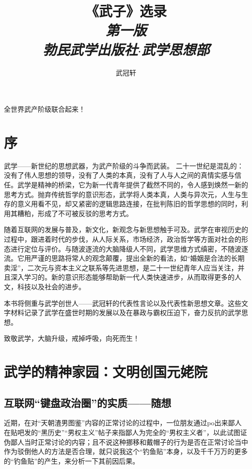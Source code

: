 \documentclass{ctexart}
\title{{\LARGE《武子》选录}\\\textit{第一版\\勃民武学出版社$\cdot$武学思想部}}
\author{武冠轩}
\date{}
\begin{document}
	\maketitle
	\vspace{10em}
	\begin{center}
		{\Large 全世界武产阶级联合起来！}
	\end{center}

	\pagebreak

	\section{序}
		武学——新世纪的思想武器，为武产阶级的斗争而武装。
		二十一世纪是混乱的：没有了伟人思想的领导，没有了人类的本真，没有了人与人之间的真情实感与信任。武学是精神的桥梁，它为新一代青年提供了截然不同的，令人感到焕然一新的思考方式。抛弃传统哲学的意识形态，武学将人类本真，人类与异次元，人生与生存的意义用看不见，却又紧密的逻辑思路连接，在批判陈旧的哲学思想的同时，利用其糟粕，形成了不可被反驳的思考方式。

		随着互联网的发展与普及，新文化，新观念与新思想触手可及。武学在审视历史的过程中，跟进着时代的步伐，从人际关系，市场经济，政治哲学等方面对社会的形态进行定位与评价。与随波逐流的大脑降级人不同，武学思维方式缜密，不随波逐流。它用严谨的思路将常人的观念颠覆，提出全新的看法，如“婚姻是合法的长期卖淫”，二次元与资本主义之联系等先进思想，是二十一世纪青年人应当关注，并且深入学习的。新的意识形态能够帮助新一代人类快速进步，从而取得更多的人文，科技以及社会的进步。

		本书将侧重与武学创世人——武冠轩的代表性言论以及代表性新思想文章。这些文字材料记录了武学在盛世时期的发展以及在暴政与霸权压迫下，奋力反抗的武学思想。

		致敬武学，大脑升级，戒掉呼吸，向死而生！
	
	\pagebreak
	\tableofcontents
	\pagebreak
	\section{武学的精神家园：文明创国元姥院}
	\subsection{互联网“键盘政治圈”的实质——随想}
	近期，在对“天朝渣男图鉴”内容的正常讨论的过程中，一位朋友通过po出来鄙人在贴吧发的“黑历史”“男权主义”帖子来指鄙人为完全的“男权主义者”，以此试图证伪鄙人当时正常讨论的内容；且不说这种挪移和戴帽子的行为是否在正常讨论当中作为驳倒他人的方法是否合理，就只说我这个“钓鱼贴”本身，以及千千万万的更多的“钓鱼贴”的产生，来分析一下其前因后果。
	
\end{document}
